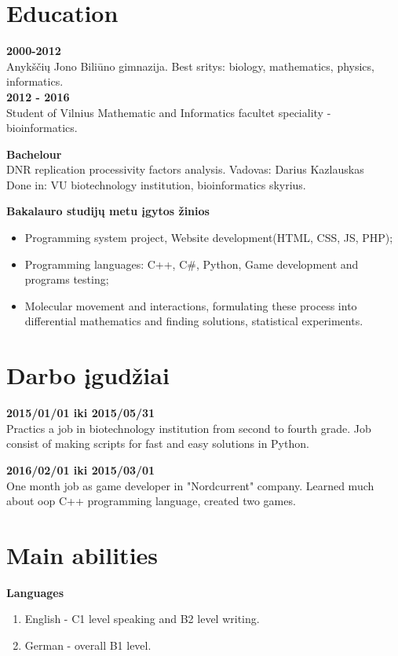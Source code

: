 \documentclass[a4paper,12pt]{article}
\begin{document}
\section{Education}
\textbf{2000-2012} \\
Anykščių Jono Biliūno gimnazija. Best sritys: biology, mathematics, physics, informatics. \\

\textbf{2012 - 2016} \\ 
Student of Vilnius Mathematic and Informatics facultet speciality - bioinformatics.

\textbf{Bachelour} \\
DNR replication processivity factors analysis.
Vadovas: Darius Kazlauskas\\
Done in: VU biotechnology institution, bioinformatics skyrius. 

\textbf{Bakalauro studijų metu įgytos žinios}
\begin{itemize}
	\item Programming system project, Website development(HTML, CSS, JS, PHP);
	\item Programming languages: C++, C\#, Python, Game development and programs testing;
	\item Molecular movement and interactions, formulating these process into differential mathematics and finding solutions, statistical experiments.
\end{itemize}

\clearpage

\vspace{8cm}


\section{Darbo įgudžiai}
\textbf{2015/01/01 iki 2015/05/31} \\
Practics a job in biotechnology institution from second to fourth grade. Job consist of making scripts for fast and easy solutions in Python.

\vspace{0.5cm}
\textbf{2016/02/01 iki 2015/03/01} \\
One month job as game developer in "Nordcurrent" company. Learned much about oop C++ programming language, created two games.
\vspace{0.5cm}



\section{Main abilities}
\textbf{Languages}
\begin{enumerate}
	\item English - C1 level speaking and B2 level writing. 
	\item German - overall B1 level.
\end{enumerate}
\end{document}
